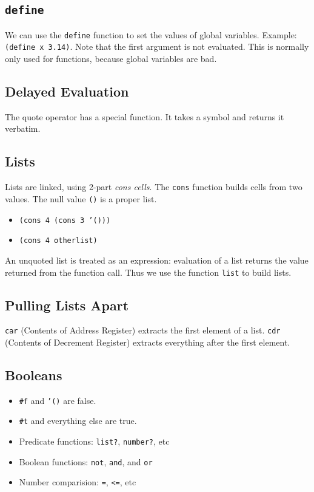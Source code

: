 \documentclass{math}
\begin{document}
\subsection*{\texttt{define}}
We can use the \texttt{define} function to set the values of global variables.
Example: \texttt{(define x 3.14)}. Note that the first argument is not
evaluated. This is normally only used for functions, because global variables
are bad.

\subsection*{Delayed Evaluation}
The quote operator has a special function. It takes a symbol and returns it
verbatim.

\subsection*{Lists}
Lists are linked, using 2-part \textit{cons cells}. The \texttt{cons} function
builds cells from two values. The null value \texttt{()} is a proper list.
\begin{itemize}
  \item \texttt{(cons 4 (cons 3 '()))}
  \item \texttt{(cons 4 otherlist)}
\end{itemize}
An unquoted list is treated as an expression: evaluation of a list returns the
value returned from the function call. Thus we use the function \texttt{list}
to build lists.

\subsection*{Pulling Lists Apart}
\texttt{car} (Contents of Address Register) extracts the first element of a
list. \texttt{cdr} (Contents of Decrement Register) extracts everything after
the first element.

\subsection*{Booleans}
\begin{itemize}
  \item \texttt{\#f} and \texttt{'()} are false.
  \item \texttt{\#t} and everything else are true.
  \item Predicate functions: \texttt{list?}, \texttt{number?}, etc
  \item Boolean functions: \texttt{not}, \texttt{and}, and \texttt{or}
  \item Number comparision: \texttt{=}, \texttt{<=}, etc
\end{itemize}
\end{document}
